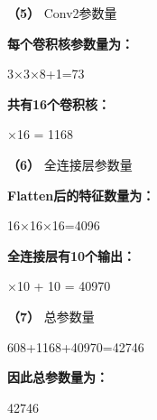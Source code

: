 \documentclass[UTF8,openany,oneside,zihao=-4,fontset=windows]{ctexbook}
\begin{document}
\par\noindent\textbf{（5）} Conv2参数量
\par\noindent\textbf{每个卷积核参数量为：}
\par 3×3×8+1=73
\par\noindent\textbf{共有16个卷积核：}
\begin{center}\small{}×16 = 1168\end{center}
\par\noindent\textbf{（6）} 全连接层参数量
\par\noindent\textbf{Flatten后的特征数量为：}
\par 16×16×16=4096
\par\noindent\textbf{全连接层有10个输出：}
\begin{center}\small{}×10 + 10 = 40970\end{center}
\par\noindent\textbf{（7）} 总参数量
\par 608+1168+40970=42746
\par\noindent\textbf{因此总参数量为：}
\par 42746
\end{document}
